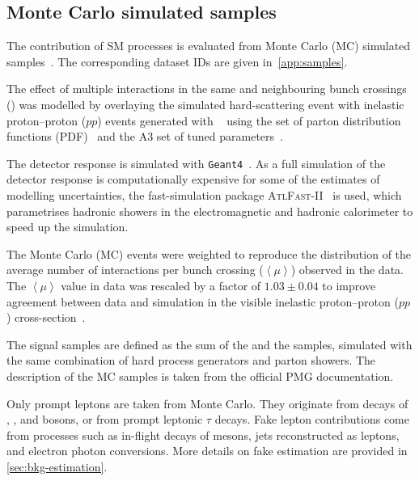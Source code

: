 \subsection{Monte Carlo simulated samples}%
\label{sec:datamc:mc} 

The contribution of SM processes is evaluated from Monte Carlo (MC) simulated
samples~\cite{SOFT-2010-01}.
The corresponding dataset IDs are given in~\cref{app:samples}.

The effect of multiple interactions in the same and neighbouring bunch
crossings (\pileup) was modelled by overlaying the simulated hard-scattering event with
inelastic proton--proton (\(pp\)) events generated with \PYTHIA[8.186]~\cite{Sjostrand:2007gs}  %
using the \NNPDF[2.3lo] set of parton distribution functions (PDF)~\cite{Ball:2012cx} and the
A3 set of tuned parameters~\cite{ATL-PHYS-PUB-2016-017}.

The detector response is simulated with \texttt{Geant4}~\cite{Agostinelli:2002hh}.
As a full simulation of the detector response is computationally expensive for
some of the estimates of modelling uncertainties, the fast-simulation package
\textsc{AtlFast-II}~\cite{SOFT-2010-01} is used, which parametrises hadronic
showers in the electromagnetic and hadronic calorimeter to speed up the simulation.

The Monte Carlo (MC) events were weighted to reproduce the
distribution of the average number of interactions per bunch crossing
(\(\left<\mu \right>\)) observed in the data. The \(\left<\mu \right>\)
value in data was rescaled by a factor of \(1.03\pm 0.04\) to improve
agreement between data and simulation in the visible inelastic
proton--proton (\(pp\)) cross-section~\cite{STDM-2015-05}.  %

The signal samples are defined as the sum of the \ttbar and the \tW samples,
simulated with the same combination of hard process generators and parton showers.
The description of the MC samples is taken from the official PMG documentation.

Only prompt leptons are taken from Monte Carlo. They originate from decays of
\Zboson, \Wboson, and \Hboson bosons, or from prompt
leptonic \( \tau \) decays. Fake lepton contributions come from processes such
as in-flight decays of mesons, jets reconstructed as leptons, and electron
photon conversions. More details on fake estimation are provided in \cref{sec:bkg-estimation}.

